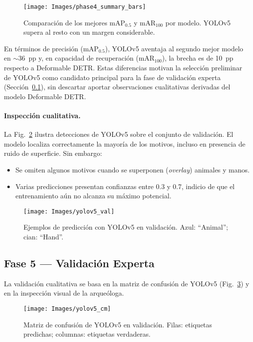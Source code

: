 \begin{figure}[!ht]
  \centering
  \texttt{[image: Images/phase4\_summary\_bars]}
  \caption{Comparación de los mejores mAP\(_{0.5}\) y mAR\(_{100}\)
           por modelo.  YOLOv5 supera al resto con un margen
           considerable.}
  \label{fig:phase4_bars}
\end{figure}

En términos de precisión (mAP\(_{0.5}\)), YOLOv5 aventaja al segundo mejor modelo en \(\sim\)36~pp y,
en capacidad de recuperación (mAR\(_{100}\)), la brecha es de 10~pp respecto a Deformable DETR.
Estas diferencias motivan la selección preliminar de YOLOv5 como candidato principal para la fase de validación experta
(Sección~\ref{ssec:fase5_experta}), sin descartar aportar observaciones cualitativas derivadas del modelo Deformable DETR.

\paragraph{Inspección cualitativa.}
La Fig.~\ref{fig:yolov5_val} ilustra detecciones de YOLOv5 sobre el conjunto de validación.
El modelo localiza correctamente la mayoría de los motivos, incluso en presencia de ruido de superficie.
Sin embargo:

\begin{itemize}
  \item Se omiten algunos motivos cuando se superponen (\emph{overlay}) animales y manos.
  \item Varias predicciones presentan confianzas entre 0.3 y 0.7, indicio de que el entrenamiento aún no alcanza su máximo potencial.
\end{itemize}

\begin{figure}[!ht]
  \centering
  \texttt{[image: Images/yolov5\_val]}
  \caption{Ejemplos de predicción con YOLOv5 en validación. Azul: “Animal”; cian: “Hand”.}
  \label{fig:yolov5_val}
\end{figure}

\subsection{Fase 5 — Validación Experta}
\label{ssec:fase5_experta}

La validación cualitativa se basa en la matriz de confusión de YOLOv5 (Fig.~\ref{fig:yolov5_cm}) y en la inspección visual de la arqueóloga.

\begin{figure}[!ht]
  \centering
  \texttt{[image: Images/yolov5\_cm]}
  \caption{Matriz de confusión de YOLOv5 en validación.
           Filas: etiquetas predichas; columnas: etiquetas verdaderas.}
  \label{fig:yolov5_cm}
\end{figure}

